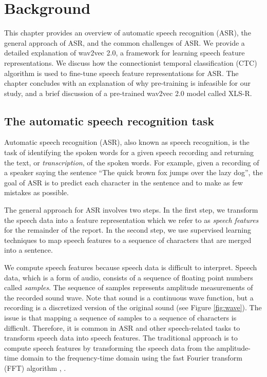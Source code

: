 \graphicspath{{background/fig/}}

\chapter{Background} \label{chap:background}
This chapter provides an overview of automatic speech recognition (ASR), the general approach of ASR, and the common challenges of ASR.
We provide a detailed explanation of wav2vec 2.0, a framework for learning speech feature representations.
We discuss how the connectionist temporal classification (CTC) algorithm is used to fine-tune speech feature representations for ASR.
The chapter concludes with an explanation of why pre-training is infeasible for our study,
and a brief discussion of a pre-trained wav2vec 2.0 model called XLS-R.

\section{The automatic speech recognition task}\label{sec:background}
Automatic speech recognition (ASR), also known as speech recognition, 
is the task of identifying the spoken words for a given speech recording and returning the text, or \emph{transcription}, of the spoken words.
For example, given a recording of a speaker saying the sentence ``The quick brown fox jumps over the lazy dog'',
the goal of ASR is to predict each character in the sentence and to make as few mistakes as possible.

The general approach for ASR involves two steps.
In the first step, we transform the speech data into a feature representation which we refer to as \emph{speech features} for the remainder of the report.
In the second step, we use supervised learning techniques to map speech features
to a sequence of characters that are merged into a sentence.

We compute speech features because speech data is difficult to interpret. 
Speech data, which is a form of audio, consists of a sequence of floating point numbers called \emph{samples}.
The sequence of samples represents amplitude measurements of the recorded sound wave. 
Note that sound is a continuous wave function, but a recording is a discretized version of the original sound (see Figure \ref{fig:wave}).
The issue is that mapping a sequence of samples to a sequence of characters is difficult.
Therefore, it is common in ASR and other speech-related tasks to transform speech data into speech features.
The traditional approach is to compute speech features by transforming the speech data from the amplitude-time domain 
to the frequency-time domain using the fast Fourier transform (FFT) algorithm \cite{cochran1967fast}, \cite{cooley1969fast}.

